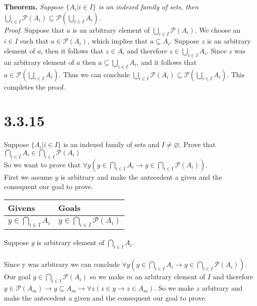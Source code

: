 \documentclass{article}
\newcommand{\n}{ \noindent }
\newcommand{\pwset}{\mathscr{P}}
\begin{document}
\n \textbf{Theorem.} \textit{Suppose $\{ A_{i} | i \in I \} $ is an indexed family of sets, then $\bigcup_{i \in I} \pwset(A_{i}) \subseteq \pwset (\bigcup_{i \in I} A_{i})$.} \\
\n \textit{Proof.} Suppose that $a$ is an arbitrary element of $\bigcup_{i \in I} \pwset(A_{i})$. We choose an $i \in I$ such that $a \in \pwset(A_i)$, which implies that $a \subseteq A_i$. Suppose $z$ is an arbitrary element of $a$, then it follows that $z \in A_i$ and therefore $z \in \bigcup_{i \in I} A_i$. Since $z$ was an arbitrary element of $a$ then $a \subseteq \bigcup_{i \in I} A_i$, and it follows that $a \in \pwset(\bigcup_{i \in I} A_i)$. Thus we can conclude $\bigcup_{i \in I} \pwset(A_{i}) \subseteq \pwset (\bigcup_{i \in I} A_{i})$. This completes the proof.


\section{3.3.15}
Suppose $ \{ A_i | i \in I \}$ is an indexed family of sets and $ I \neq \varnothing$. Prove that $\bigcap_{i \in I} A_i \in \bigcap_{i \in I} \pwset(A_i)$ \\

\n So we want to prove that $\forall y (y \in \bigcap_{i \in I} A_i \rightarrow y \in \bigcap_{i \in I} \pwset(A_i))$. \\

\n First we assume $y$ is arbitrary and make the antecedent a given and the consequent our goal to prove. \\

\begin{table}[h]
\begin{tabular}{ll}
\hline
Givens & Goals   \\ \hline
$y \in \bigcap_{i \in I} A_i$ & $y \in \bigcap_{i \in I} \pwset(A_i)$   \\ \hline
\end{tabular}
\end{table}

\n Suppose $y$ is arbitrary element of $\bigcap_{i \in I} A_i$. \\
\indent [proof of $y \in \bigcap_{i \in I} \pwset(A_i)$] \\
\n Since y was arbitrary we can conclude $\forall y (y \in \bigcap_{i \in I} A_i \rightarrow y \in \bigcap_{i \in I} \pwset(A_i))$. \\

\n Our goal $y \in \bigcap_{i \in I} \pwset(A_i)$ so we make $m$ an arbitrary element of $I$ and therefore $y \in \pwset(A_m) \rightarrow y \subseteq A_m \rightarrow \forall z (z \in y \rightarrow z \in A_m)$. So we make $z$ arbitrary and make the antecedent a given and the consequent our goal to prove. \\
\end{document}
